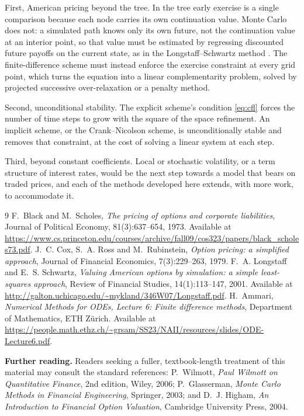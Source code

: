 \documentclass[11pt,a4paper]{article}
\numberwithin{equation}{section}
\theoremstyle{definition}
\theoremstyle{plain}
\theoremstyle{remark}
\begin{document}
First, American pricing beyond the tree. In the tree early exercise is a single
comparison because each node carries its own continuation value. Monte Carlo does
not: a simulated path knows only its own future, not the continuation value at an
interior point, so that value must be estimated by regressing discounted future
payoffs on the current state, as in the Longstaff--Schwartz method
\cite{longstaffschwartz}. The finite-difference scheme must instead enforce the
exercise constraint at every grid point, which turns the equation into a linear
complementarity problem, solved by projected successive over-relaxation or a
penalty method.

Second, unconditional stability. The explicit scheme's condition \eqref{eq:cfl}
forces the number of time steps to grow with the square of the space refinement.
An implicit scheme, or the Crank--Nicolson scheme, is unconditionally stable and
removes that constraint, at the cost of solving a linear system at each step.

Third, beyond constant coefficients. Local or stochastic volatility, or a term
structure of interest rates, would be the next step towards a model that bears on
traded prices, and each of the methods developed here extends, with more work, to
accommodate it.

\clearpage
\begin{thebibliography}{9}
 F.~Black and M.~Scholes,
  \emph{The pricing of options and corporate liabilities},
  Journal of Political Economy, 81(3):637--654, 1973.
  Available at \url{https://www.cs.princeton.edu/courses/archive/fall09/cos323/papers/black_scholes73.pdf}.
 J.~C. Cox, S.~A. Ross and M.~Rubinstein,
  \emph{Option pricing: a simplified approach},
  Journal of Financial Economics, 7(3):229--263, 1979.
 F.~A. Longstaff and E.~S. Schwartz,
  \emph{Valuing American options by simulation: a simple least-squares approach},
  Review of Financial Studies, 14(1):113--147, 2001.
  Available at \url{http://galton.uchicago.edu/~mykland/346W07/Longstaff.pdf}.
 H.~Ammari,
  \emph{Numerical Methods for ODEs, Lecture 6: Finite difference methods},
  Department of Mathematics, ETH Z\"urich.
  Available at \url{https://people.math.ethz.ch/~grsam/SS23/NAII/resources/slides/ODE-Lecture6.pdf}.
\end{thebibliography}

\vspace{1em}
\noindent\textbf{Further reading.} Readers seeking a fuller, textbook-length
treatment of this material may consult the standard references: P.~Wilmott,
\emph{Paul Wilmott on Quantitative Finance}, 2nd edition, Wiley, 2006;
P.~Glasserman, \emph{Monte Carlo Methods in Financial Engineering}, Springer,
2003; and D.~J. Higham, \emph{An Introduction to Financial Option Valuation},
Cambridge University Press, 2004.
\end{document}
